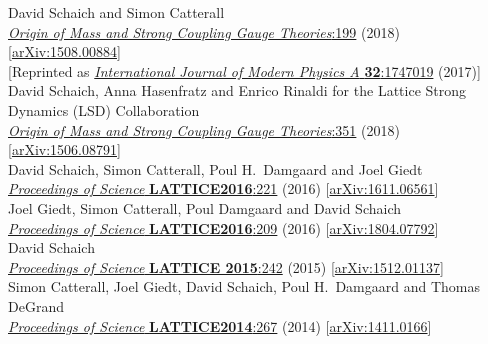 \begin{spacelist}
\begin{revnumerate}
      David Schaich and Simon Catterall \\
      \href{https://doi.org/10.1142/9789813231467_0028}{\textit{Origin of Mass and Strong Coupling Gauge Theories}:199} (2018) [\href{http://arxiv.org/abs/1508.00884}{arXiv:1508.00884}] \\
      {[Reprinted as \href{https://doi.org/10.1142/S0217751X17470194}{\textit{International Journal of Modern Physics A} \textbf{32}:1747019} (2017)]}
    \pagebreakitem
       \\
      David Schaich, Anna Hasenfratz and Enrico Rinaldi for the Lattice Strong Dynamics (LSD) Collaboration \\
      \href{https://doi.org/10.1142/9789813231467_0051}{\textit{Origin of Mass and Strong Coupling Gauge Theories}:351} (2018) [\href{http://arxiv.org/abs/1506.08791}{arXiv:1506.08791}]
    \pagebreakitem
       \\
      David Schaich, Simon Catterall, Poul H.~Damgaard and Joel Giedt \\
      \href{https://doi.org/10.22323/1.256.0221}{\textit{Proceedings of Science} \textbf{LATTICE2016}:221} (2016) [\href{http://arxiv.org/abs/1611.06561}{arXiv:1611.06561}]
    \pagebreakitem
       \\
      Joel Giedt, Simon Catterall, Poul Damgaard and David Schaich \\
      \href{https://doi.org/10.22323/1.256.0209}{\textit{Proceedings of Science} \textbf{LATTICE2016}:209} (2016) [\href{http://arxiv.org/abs/1804.07792}{arXiv:1804.07792}]
    \pagebreakitem
       \\
      David Schaich \\
      \href{https://doi.org/10.22323/1.251.0242}{\textit{Proceedings of Science} \textbf{LATTICE 2015}:242} (2015) [\href{http://arxiv.org/abs/1512.01137}{arXiv:1512.01137}]
    \pagebreakitem
       \\
      Simon Catterall, Joel Giedt, David Schaich, Poul H.~Damgaard and Thomas DeGrand \\
      \href{https://doi.org/10.22323/1.214.0267}{\textit{Proceedings of Science} \textbf{LATTICE2014}:267} (2014) [\href{http://arxiv.org/abs/1411.0166}{arXiv:1411.0166}]

\end{revnumerate}
\end{spacelist}
